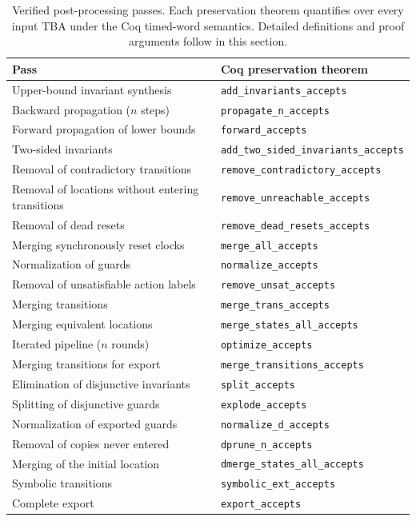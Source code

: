 \documentclass{ieeeaccess}
\begin{document}
\begin{table}[t]
\centering
\caption{Verified post-processing passes. Each preservation theorem quantifies over every input TBA under the Coq timed-word semantics. Detailed definitions and proof arguments follow in this section.}
\label{tab:post-passes}
\small
\begin{tabular}{@{}p{}p{}@{}}
\toprule
Pass & Coq preservation theorem\\
\midrule
Upper-bound invariant synthesis & \texttt{add\_invariants\_accepts}\\
Backward propagation ($n$ steps) & \texttt{propagate\_n\_accepts}\\
Forward propagation of lower bounds & \texttt{forward\_accepts}\\
Two-sided invariants & \texttt{add\_two\_sided\_invariants\_accepts}\\
Removal of contradictory transitions & \texttt{remove\_contradictory\_accepts}\\
Removal of locations without entering transitions & \texttt{remove\_unreachable\_accepts}\\
Removal of dead resets & \texttt{remove\_dead\_resets\_accepts}\\
Merging synchronously reset clocks & \texttt{merge\_all\_accepts}\\
Normalization of guards & \texttt{normalize\_accepts}\\
Removal of unsatisfiable action labels & \texttt{remove\_unsat\_accepts}\\
Merging transitions & \texttt{merge\_trans\_accepts}\\
Merging equivalent locations & \texttt{merge\_states\_all\_accepts}\\
Iterated pipeline ($n$ rounds) & \texttt{optimize\_accepts}\\
Merging transitions for export & \texttt{merge\_transitions\_accepts}\\
Elimination of disjunctive invariants & \texttt{split\_accepts}\\
Splitting of disjunctive guards & \texttt{explode\_accepts}\\
Normalization of exported guards & \texttt{normalize\_d\_accepts}\\
Removal of copies never entered & \texttt{dprune\_n\_accepts}\\
Merging of the initial location & \texttt{dmerge\_states\_all\_accepts}\\
Symbolic transitions & \texttt{symbolic\_ext\_accepts}\\
Complete export & \texttt{export\_accepts}\\
\bottomrule
\end{tabular}
\end{table}
\end{document}
